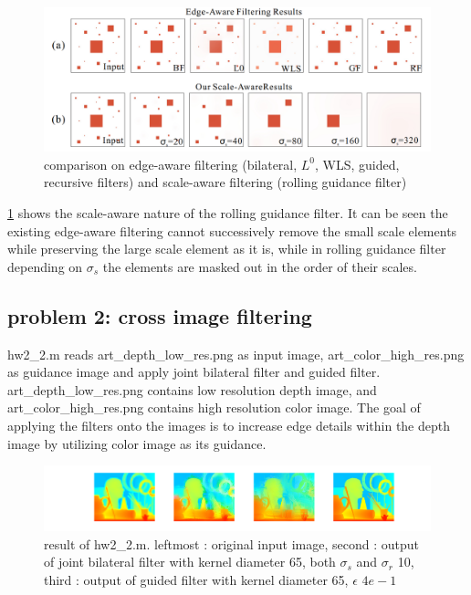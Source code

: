 \documentclass[extendedabs]{bmvc2k}
\begin{document}
\begin{figure}[h]
    \centering
    \includegraphics[width=\linewidth]{hw2_1_8}
    \caption{comparison on edge-aware filtering (bilateral, $L^0$, WLS, guided, recursive filters) 
    and scale-aware filtering (rolling guidance filter)}
    \label{fig:8}
\end{figure}

\figurename{\ref{fig:8}} shows the scale-aware nature of the rolling guidance filter.
It can be seen the existing edge-aware filtering cannot successively remove the small scale
elements while preserving the large scale element as it is, while in rolling guidance filter
depending on $\sigma_s$ the elements are masked out in the order of their scales. 

\subsection*{problem 2: cross image filtering}

hw2\_2.m reads art\_depth\_low\_res.png as input image,  art\_color\_high\_res.png
as guidance image and apply joint bilateral filter and guided filter.
art\_depth\_low\_res.png contains low resolution depth image, and art\_color\_high\_res.png
contains high resolution color image. The goal of applying the filters onto the images
is to increase edge details within the depth image by utilizing color image as its
guidance.

\begin{figure}[h]
    \centering
    \includegraphics[width=\linewidth]{hw2_2_1}
    \caption{result of hw2\_2.m. leftmost : original input image,
    second : output of joint bilateral filter with kernel diameter 65,
    both $\sigma_s$ and $\sigma_r$ 10,
    third : output of guided filter with kernel diameter 65, $\epsilon$ $4e-1$}
    \label{fig:9}
\end{figure}
\end{document}
